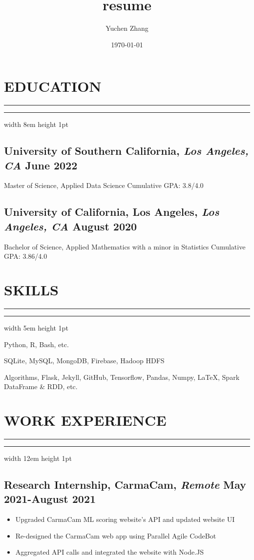 \documentclass[11pt]{article}
\title{resume}
\author{Yuchen Zhang}
\date{\today}
\newcommand{\divider}[1]{%
	\vskip-2pt %
	{%
		\color{black}%
		\hrule%
	}%
	\nointerlineskip%
	\noindent%
	{%
		\color{black}%
		\hrule width #1 height 1pt%
	}%
	\vskip5pt%
}
\begin{document}
\section*{EDUCATION}
\divider{8em}
\subsection*{University of Southern California{\normalfont, \textit{Los Angeles, CA} \hfill June 2022}}
\noindent
Master of Science, Applied Data Science
\hfill
Cumulative GPA: 3.8/4.0

\vspace{0.1in}

\subsection*{University of California, Los Angeles{\normalfont, \textit{Los Angeles, CA} \hfill August 2020}}
\noindent
Bachelor of Science, Applied Mathematics with a minor in Statistics 
\hfill 
Cumulative GPA: 3.86/4.0

\vspace{0.1in}

\section*{SKILLS}
\divider{5em}
\begin{description}
    \setlength\itemsep{-1pt}
    \item[Programming Languages] Python, R, Bash, etc.
    \item[Database Management] SQLite, MySQL, MongoDB, Firebase, Hadoop HDFS
    \item[Tools] Algorithms, Flask, Jekyll, GitHub, Tensorflow, Pandas, Numpy, \LaTeX, Spark DataFrame \& RDD, etc.
\end{description}

\section*{WORK EXPERIENCE}
\divider{12em}
\subsection*{Research Internship{\normalfont, CarmaCam, \textit{Remote} \hfill May 2021-August 2021}}
\begin{itemize}
    \setlength\itemsep{-1pt}
    \item Upgraded CarmaCam ML scoring website's API and updated website UI
    \item Re-designed the CarmaCam web app using Parallel Agile\textregistered\xspace CodeBot\textregistered
    \item Aggregated API calls and integrated the website with Node.JS
\end{itemize}
\end{document}
